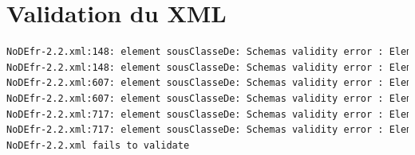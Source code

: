 \documentclass[11pt]{report}
\begin{document}
\section{Validation du XML}
\begin{lstlisting}[language=bash]
NoDEfr-2.2.xml:148: element sousClasseDe: Schemas validity error : Element 'sousClasseDe': 'RC0050,' is not a valid value of the atomic type 'xs:IDREF'.
NoDEfr-2.2.xml:148: element sousClasseDe: Schemas validity error : Element 'sousClasseDe': 'RC0050, RC0030' is not a valid value of the list type 'xs:IDREFS'.
NoDEfr-2.2.xml:607: element sousClasseDe: Schemas validity error : Element 'sousClasseDe': 'RC0050,' is not a valid value of the atomic type 'xs:IDREF'.
NoDEfr-2.2.xml:607: element sousClasseDe: Schemas validity error : Element 'sousClasseDe': 'RC0050, RC0030' is not a valid value of the list type 'xs:IDREFS'.
NoDEfr-2.2.xml:717: element sousClasseDe: Schemas validity error : Element 'sousClasseDe': 'RC0100,' is not a valid value of the atomic type 'xs:IDREF'.
NoDEfr-2.2.xml:717: element sousClasseDe: Schemas validity error : Element 'sousClasseDe': 'RC0100, RC0030' is not a valid value of the list type 'xs:IDREFS'.
NoDEfr-2.2.xml fails to validate
\end{lstlisting}
\end{document}
